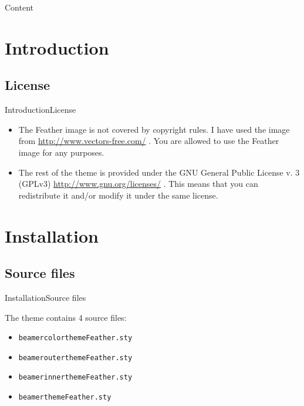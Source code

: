 \documentclass[aspectratio=169]{beamer}
\newcommand{\chref}[2]{
  \href{#1}{\usebeamercolor{fg}{}#2}
}
\begin{document}
\begin{frame}{Content}{}
\tableofcontents
\end{frame}
\section{Introduction}
\subsection{License}
\begin{frame}{Introduction}{License}

  \begin{itemize}
    \item<1-> The Feather image is not covered by copyright rules. I have used the image from \chref{http://www.vectors-free.com/}{http://www.vectors-free.com/}. You are allowed to use the Feather image for any purposes.
    \item<2-> The rest of the theme is provided under the GNU General Public License v. 3 (GPLv3) \chref{http://www.gnu.org/licenses/}{http://www.gnu.org/licenses/}. This means that you can redistribute it and/or modify it under the same license. 
  \end{itemize}
\end{frame}

\section{Installation}
\subsection{Source files}
\begin{frame}{Installation}{Source files}

\begin{block}{}
The theme contains 4 source files:
  \begin{itemize}
    \item {\tt beamercolorthemeFeather.sty}
    \item {\tt beamerouterthemeFeather.sty}
    \item {\tt beamerinnerthemeFeather.sty}
    \item {\tt beamerthemeFeather.sty}
  \end{itemize}
\end{block}
\end{frame}
\end{document}
